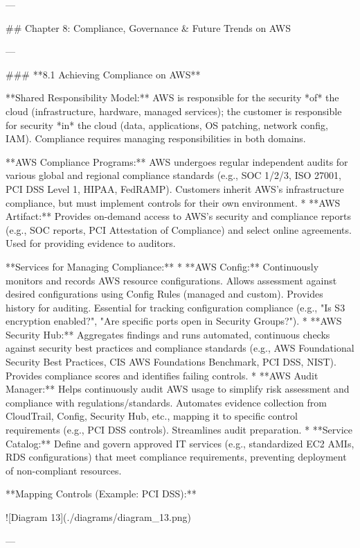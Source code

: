 \documentclass{article}
\begin{document}
---

## Chapter 8: Compliance, Governance & Future Trends on AWS

---

### **8.1 Achieving Compliance on AWS**

**Shared Responsibility Model:** AWS is responsible for the security *of* the cloud (infrastructure, hardware, managed services); the customer is responsible for security *in* the cloud (data, applications, OS patching, network config, IAM). Compliance requires managing responsibilities in both domains.

**AWS Compliance Programs:** AWS undergoes regular independent audits for various global and regional compliance standards (e.g., SOC 1/2/3, ISO 27001, PCI DSS Level 1, HIPAA, FedRAMP). Customers inherit AWS's infrastructure compliance, but must implement controls for their own environment.
* **AWS Artifact:** Provides on-demand access to AWS's security and compliance reports (e.g., SOC reports, PCI Attestation of Compliance) and select online agreements. Used for providing evidence to auditors.

**Services for Managing Compliance:**
* **AWS Config:** Continuously monitors and records AWS resource configurations. Allows assessment against desired configurations using Config Rules (managed and custom). Provides history for auditing. Essential for tracking configuration compliance (e.g., "Is S3 encryption enabled?", "Are specific ports open in Security Groups?").
* **AWS Security Hub:** Aggregates findings and runs automated, continuous checks against security best practices and compliance standards (e.g., AWS Foundational Security Best Practices, CIS AWS Foundations Benchmark, PCI DSS, NIST). Provides compliance scores and identifies failing controls.
* **AWS Audit Manager:** Helps continuously audit AWS usage to simplify risk assessment and compliance with regulations/standards. Automates evidence collection from CloudTrail, Config, Security Hub, etc., mapping it to specific control requirements (e.g., PCI DSS controls). Streamlines audit preparation.
* **Service Catalog:** Define and govern approved IT services (e.g., standardized EC2 AMIs, RDS configurations) that meet compliance requirements, preventing deployment of non-compliant resources.

**Mapping Controls (Example: PCI DSS):**


![Diagram 13](./diagrams/diagram_13.png)



---
\end{document}
